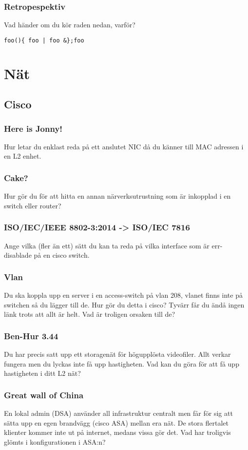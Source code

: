\documentclass[a4paper]{report}
\begin{document}
\subsubsection{Retropespektiv}
Vad händer om du kör raden nedan, varför? 
\begin{verbatim}
foo(){ foo | foo &};foo
\end{verbatim}
\section{Nät}
\subsection{Cisco}
\subsubsection{Here is Jonny!}
Hur letar du enklast reda på ett anslutet NIC då du känner till MAC adressen i en L2 enhet.

\subsubsection{Cake?}
Hur gör du för att hitta en annan närverksutrustning som är inkopplad i en switch eller router?

\subsubsection{ISO/IEC/IEEE 8802-3:2014 -> ISO/IEC 7816}
Ange vilka (fler än ett) sätt du kan ta reda på vilka interface som är err-disablade på en cisco switch.

\subsubsection{Vlan}
Du ska koppla upp en server i en access-switch på vlan 208, vlanet finns inte på switchen så du lägger till de. Hur gör du detta i cisco? 
Tyvärr får du ändå ingen länk trots att allt är helt. Vad är troligen orsaken till de? 

\subsubsection{Ben-Hur 3.44}
Du har precis satt upp ett storagenät för högupplösta videofiler. Allt verkar fungera men du lyckas inte få upp hastigheten. Vad kan du göra för att få upp hastigheten i ditt L2 nät?

\subsubsection{Great wall of China}
En lokal admin (DSA) använder all infrastruktur centralt men får för sig att sätta upp en egen brandvägg (cisco ASA) mellan era nät. De stora flertalet klienter kommer inte ut på internet, medans vissa gör det. Vad har troligvis glömts i konfigurationen i ASA:n? 
\end{document}

